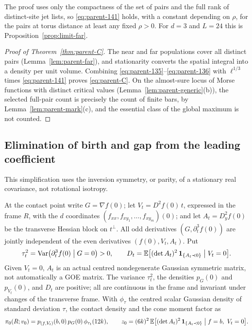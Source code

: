 The proof uses only the compactness of the set of pairs and the full rank of distinct-site jet lists, so \eqref{eq:parent-141} holds, with a constant depending on $\rho$, for the pairs at torus distance at least any fixed $\rho>0$. For $d=3$ and $L=24$ this is Proposition~\ref{prop:limit-far}.

\begin{proof}[Proof of Theorem~\ref{thm:parent-C}]
The near and far populations cover all distinct pairs (Lemma~\ref{lem:parent-far}), and stationarity converts the spatial integral into a density per unit volume. Combining \eqref{eq:parent-135}--\eqref{eq:parent-136} with $\ell^{1/3}$ times \eqref{eq:parent-141} proves \eqref{eq:parent-C}. On the almost-sure locus of Morse functions with distinct critical values (Lemma~\ref{lem:parent-generic}(b)), the selected full-pair count is precisely the count of finite bars, by Lemma~\ref{lem:parent-mark}(c), and the essential class of the global maximum is not counted.
\end{proof}

\subsection{Elimination of birth and gap from the leading coefficient}\label{ssec:parent-coef}

This simplification uses the inversion symmetry, or parity, of a stationary real covariance, not rotational isotropy.

\begin{lemma}\label{lem:parent-parity}
At the contact point write $G=\nabla f(0)$; let $V_t=D^2f(0)\,t$, expressed in the frame $R$, with the $d$ coordinates $(f_{xx},f_{xy_1},\dots,f_{xy_m})(0)$; and let $A_t=D_y^2f(0)$ be the transverse Hessian block on $t^\perp$. All odd derivatives $(G,\partial_t^3f(0))$ are jointly independent of the even derivatives $(f(0),V_t,A_t)$. Put
\begin{equation}\label{eq:parent-151}
\tau_t^2=\operatorname{Var}\bigl(\partial_t^3f(0)\bigm|G=0\bigr)>0,\qquad D_t=\mathbb E\bigl[(\det A_t)^2\,\mathbf 1_{\{A_t\prec0\}}\bigm|V_t=0\bigr].
\end{equation}
Given $V_t=0$, $A_t$ is an actual centred nondegenerate Gaussian symmetric matrix, not automatically a GOE matrix. The variance $\tau_t^2$, the densities $p_G(0)$ and $p_{V_t}(0)$, and $D_t$ are positive; all are continuous in the frame and invariant under changes of the transverse frame. With $\phi_\tau$ the centred scalar Gaussian density of standard deviation $\tau$, the contact density and the cone moment factor as
\begin{equation}\label{eq:parent-factor}
\pi_0(R;v_0)=p_{(f,V_t)}(b,0)\,p_G(0)\,\phi_{\tau_t}(12k),\qquad z_0=(6k)^2\,\E\bigl[(\det A_t)^2\,\ind_{\{A_t\prec0\}}\bigm|f=b,\ V_t=0\bigr].
\end{equation}
\end{lemma}

